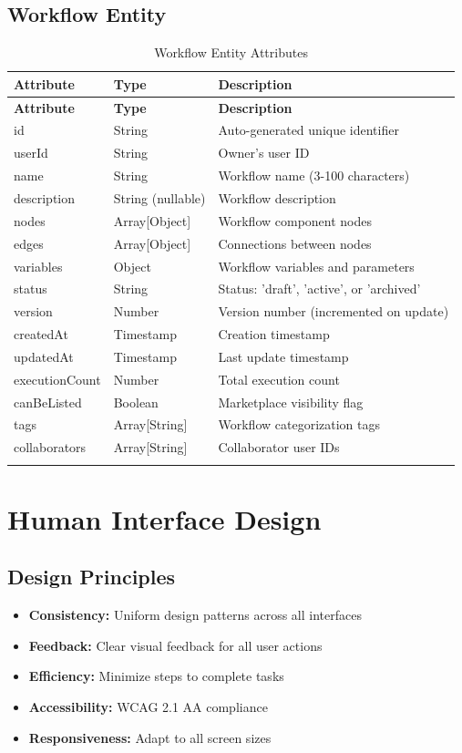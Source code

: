 \documentclass[12pt,a4paper]{article}
\begin{document}
\subsection{Workflow Entity}
\begin{longtable}{|p{4cm}|p{3cm}|p{7cm}|}
\hline
\textbf{Attribute} & \textbf{Type} & \textbf{Description}\\
\hline
\endfirsthead
\hline
\textbf{Attribute} & \textbf{Type} & \textbf{Description}\\
\hline
\endhead
id & String & Auto-generated unique identifier\\
\hline
userId & String & Owner's user ID\\
\hline
name & String & Workflow name (3-100 characters)\\
\hline
description & String (nullable) & Workflow description\\
\hline
nodes & Array[Object] & Workflow component nodes\\
\hline
edges & Array[Object] & Connections between nodes\\
\hline
variables & Object & Workflow variables and parameters\\
\hline
status & String & Status: 'draft', 'active', or 'archived'\\
\hline
version & Number & Version number (incremented on update)\\
\hline
createdAt & Timestamp & Creation timestamp\\
\hline
updatedAt & Timestamp & Last update timestamp\\
\hline
executionCount & Number & Total execution count\\
\hline
canBeListed & Boolean & Marketplace visibility flag\\
\hline
tags & Array[String] & Workflow categorization tags\\
\hline
collaborators & Array[String] & Collaborator user IDs\\
\hline
\caption{Workflow Entity Attributes}
\end{longtable}

\newpage

\section{Human Interface Design}

\subsection{Design Principles}
\begin{itemize}
    \item \textbf{Consistency:} Uniform design patterns across all interfaces
    \item \textbf{Feedback:} Clear visual feedback for all user actions
    \item \textbf{Efficiency:} Minimize steps to complete tasks
    \item \textbf{Accessibility:} WCAG 2.1 AA compliance
    \item \textbf{Responsiveness:} Adapt to all screen sizes
\end{itemize}
\end{document}
